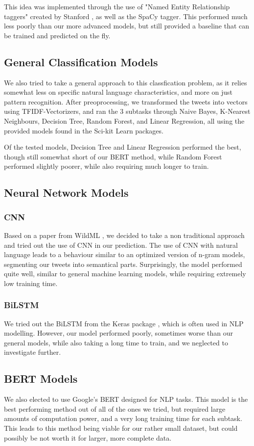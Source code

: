 \documentclass[a4paper, 12pt]{article}
\begin{document}
\begin{multicols}{2}
                This idea was implemented through the use of "Named Entity Relationship taggers" created by Stanford \cite{stanNER}, as well as the SpaCy \cite{spacy2} tagger. This performed much less poorly than our more advanced models, but still provided a baseline that can be trained and predicted on the fly.
        \subsection{General Classification Models}
            We also tried to take a general approach to this classfication problem, as it relies somewhat less on specific natural language characteristics, and more on just pattern recognition. After preoprocessing, we transformed the tweets into vectors using TFIDF-Vectorizers, and ran the 3 subtasks through Naive Bayes, K-Nearest Neighbours, Decision Tree, Random Forest, and Linear Regression, all using the provided models found in the Sci-kit Learn \cite{scikit-learn} packages.

            Of the tested models, Decision Tree and Linear Regression performed the best, though still somewhat short of our BERT method, while Random Forest performed slightly poorer, while also requiring much longer to train.
        \subsection{Neural Network Models}
            \subsubsection{CNN}
                Based on a paper from WildML \cite{wildML}, we decided to take a non traditional approach and tried out the use of CNN in our prediction. The use of CNN with natural language leads to a behaviour similar to an optimized version of n-gram models, segmenting our tweets into semantical parts. Surprisingly, the model performed quite well, similar to general machine learning models, while requiring extremely low training time.
            \subsubsection{BiLSTM}
                We tried out the BiLSTM from the Keras package \cite{keras}, which is often used in NLP modelling. However, our model performed poorly, sometimes worse than our general models, while also taking a long time to train, and we neglected to investigate further.
        \subsection{BERT Models}
            We also elected to use Google's BERT \cite{bert} designed for NLP tasks. This model is the best performing method out of all of the ones we tried, but required large amounts of computation power, and a very long training time for each subtask. This leads to this method being viable for our rather small dataset, but could possibly be not worth it for larger, more complete data.

\end{multicols}
\end{document}
